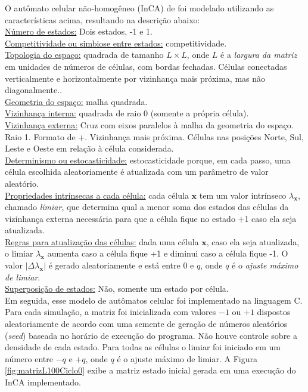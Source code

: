 \documentclass[
	12pt,				%
	openright,			%
	twoside,			%
	a4paper,			%
	english,			%
	french,				%
	spanish,			%
	brazil				%
	]{abntex2}
\begin{document}
O autômato celular não-homogêneo (InCA) de  foi modelado utilizando as características acima, resultando na descrição abaixo:\\
\underline{Número de estados:} Dois estados, -1 e 1.\\
\underline{Competitividade ou simbiose entre estados:} competitividade.\\
\underline{Topologia do espaço:} quadrada de tamanho $L\times L$, onde $L$ é a \textit{largura da matriz} em unidades de números de células, com bordas fechadas. Células conectadas verticalmente e horizontalmente por vizinhança mais próxima, mas não diagonalmente..\\
\underline{Geometria do espaço:} malha quadrada.\\
\underline{Vizinhança interna:} quadrada de raio 0 (somente a própria célula).\\
\underline{Vizinhança externa:} Cruz com eixos paralelos à malha da geometria do espaço. Raio 1. Formato de +. Vizinhança mais próxima. Células nas posições Norte, Sul, Leste e Oeste em relação à célula considerada.\\
\underline{Determinismo ou estocasticidade:} estocasticidade porque, em cada passo, uma célula escolhida aleatoriamente é atualizada com um parâmetro de valor aleatório.\\
\underline{Propriedades intrínsecas a cada célula:} cada célula $\mathbf{x}$ tem um valor intrínseco $\lambda_\mathbf{x}$, chamado \textit{limiar}, que determina qual a menor soma dos estados das células da vizinhança externa necessária para que a célula fique no estado +1 caso ela seja atualizada.\\
\underline{Regras para atualização das células:}  dada uma célula $\mathbf{x}$, caso ela seja atualizada, o limiar $\lambda_\mathbf{x}$ aumenta caso a célula fique +1 e diminui caso a célula fique -1. O valor $|\Delta\lambda_\mathbf{x}|$ é gerado aleatoriamente e está entre $0$ e $q$, onde $q$ é o \textit{ajuste máximo de limiar}.\\
\underline{Superposição de estados:} Não, somente um estado por célula.\\

Em seguida, esse modelo de autômatos celular foi implementado na linguagem C. Para cada simulação, a matriz foi inicializada com valores $-1$ ou $+1$ dispostos aleatoriamente de acordo com uma semente de geração de números aleatórios (\textit{seed}) baseada no horário de execução do programa. Não houve controle sobre a densidade de cada estado. Para todas as células o limiar foi iniciado em um número entre $-q$ e $+q$, onde $q$ é o ajuste máximo de limiar. A Figura \ref{fig:matrizL100Ciclo0} exibe a matriz estado inicial gerada em uma execução do InCA implementado.
\end{document}
